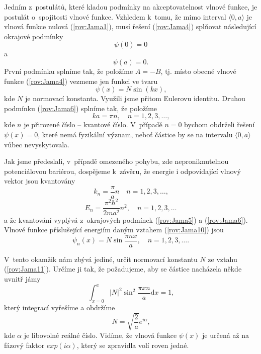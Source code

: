 Jedním z~postulátů, které kladou podmínky na akceptovatelnost vlnové funkce, je postulát o~spojitosti vlnové funkce. Vzhledem k~tomu, že mimo interval $\langle0,a\rangle$ je vlnová funkce nulová (\ref{rov:Jama1}), musí řešení (\ref{rov:Jama4}) splňovat následující okrajové podmínky
\begin{equation}
\psi(0)=0
\label{rov:Jama5}
\end{equation}
a
\begin{equation}
\psi(a)=0 \mbox{.}
\label{rov:Jama6}
\end{equation}
První podmínku splníme tak, že položíme $A = -B$, tj. místo obecné vlnové funkce (\ref{rov:Jama4}) vezmeme jen funkci ve tvaru
\begin{equation}
\psi(x)=N \sin(kx) \mbox{,}
\label{rov:Jama7}
\end{equation}
kde $N$ je normovací konstanta. Využili jsme přitom Eulerovu identitu. Druhou podmínku (\ref{rov:Jama6}) splníme tak, že položíme
\begin{equation}
ka = \pi n, \quad n= 1,2,3, \dots \mbox{,}
\label{rov:Jama8}
\end{equation}
kde $n$ je přirozené číslo -- kvantové číslo. V~případě $n=0$ bychom obdrželi řešení $\psi(x)=0$, které nemá fyzikální význam, neboť částice by se na intervalu $\langle0,a\rangle$ vůbec nevyskytovala.

Jak jsme předeslali, v~případě omezeného pohybu, zde neproniknutelnou potenciálovou bariérou, dospějeme k~závěru, že energie i odpovídající vlnový vektor jsou kvantovány
\begin{equation}
k_n = \frac{\pi}{a}n \quad n=1,2,3, \dots \mbox{,}
\label{rov:Jama9}
\end{equation}
\begin{equation}
E_n = \frac{\pi^2\hbar^2}{2ma^2}n^2, \quad n=1,2,3, \dots 
\label{rov:Jama10}
\end{equation}
a že kvantování vyplývá z~okrajových podmínek (\ref{rov:Jama5}) a (\ref{rov:Jama6}). Vlnové funkce příslušející energiím daným vztahem (\ref{rov:Jama10}) jsou
\begin{equation}
\psi_n(x) = N \sin \frac{\pi n x}{a}, \quad n=1,2,3,\dots \mbox{.}
\label{rov:Jama11}
\end{equation}

V~tento okamžik nám zbývá jediné, určit normovací konstantu $N$ ze vztahu (\ref{rov:Jama11}). Určíme ji tak, že požadujeme, aby se částice nacházela někde uvnitř jámy
\begin{equation}
\int_{x=0}^a |N|^2 \sin^2 \frac{\pi x n}{a} \mathrm{d}x = 1 \mbox{,}
\label{rov:Jama12}
\end{equation}
který integrací vyřešíme a obdržíme
\begin{equation}
N = \sqrt{\frac{2}{a}}e^{i\alpha} \mbox{,}
\label{rov:Jama13}
\end{equation}
kde $\alpha$ je libovolné reálné číslo. Vidíme, že vlnová funkce $\psi(x)$ je určená až na fázový faktor $exp(i\alpha)$, který se zpravidla volí roven jedné.

